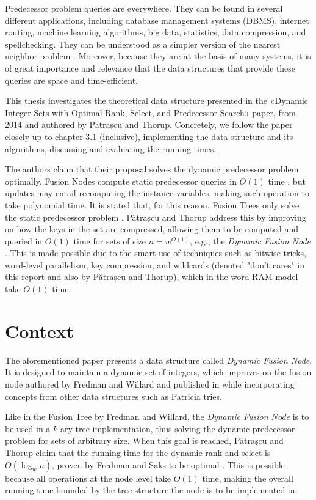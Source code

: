 Predecessor problem queries are everywhere. They can be found in several different applications, including database management systems (DBMS), internet routing, machine learning algorithms, big data, statistics, data compression, and spellchecking. They can be understood as a simpler version of the nearest neighbor problem \cite{bille2020massive}. Moreover, because they are at the basis of many systems, it is of great importance and relevance that the data structures that provide these queries are space and time-efficient.

This thesis investigates the theoretical data structure presented in the «Dynamic Integer Sets with Optimal Rank, Select, and Predecessor Search» paper, from 2014 and authored by Pătrașcu and Thorup. Concretely, we follow the paper closely up to chapter 3.1 (inclusive), implementing the data structure and its algorithms, discussing and evaluating the running times.

The authors claim that their proposal solves the dynamic predecessor problem optimally.
Fusion Nodes compute static predecessor queries in $O(1)$ time \cite{fredman1993surpassing}, but updates may entail recomputing the instance variables, making such operation to take polynomial time.
It is stated that, for this reason, Fusion Trees only solve the static predecessor problem \cite{nelsonjelanilec2}.
Pătrașcu and Thorup address this by improving on how the keys in the set are compressed, allowing them to be computed and queried in $O(1)$ time for sets of size $n = w^{O(1)}$, e.g., the \textit{Dynamic Fusion Node} \cite{patrascu2014dynamic}.
This is made possible due to the smart use of techniques such as bitwise tricks, word-level parallelism, key compression, and wildcards (denoted "don't cares" in this report and also by Pătrașcu and Thorup), which in the word RAM model take $O(1)$ time.

\section{Context}

The aforementioned paper presents a data structure called \textit{Dynamic Fusion Node}. It is designed to maintain a dynamic set of integers, which improves on the fusion node authored by Fredman and Willard and published in \cite{fredman1993surpassing} while incorporating concepts from other data structures such as Patricia tries.

Like in the Fusion Tree by Fredman and Willard, the \textit{Dynamic Fusion Node} is to be used in a $k$-ary tree implementation, thus solving the dynamic predecessor problem for sets of arbitrary size. When this goal is reached, Pătrașcu and Thorup claim that the running time for the dynamic rank and select is $O(\log_w n)$, proven by Fredman and Saks to be optimal \cite{fredman1989cell}. This is possible because all operations at the node level take $O(1)$ time, making the overall running time bounded by the tree structure the node is to be implemented in.

